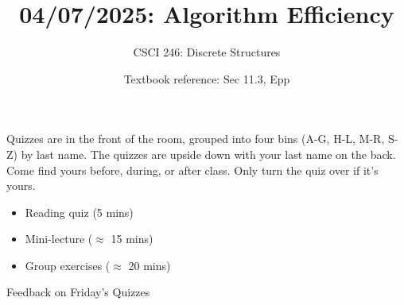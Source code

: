 \documentclass[10pt]{beamer}
\begin{document}




\title{04/07/2025: Algorithm Efficiency}
\author{CSCI 246: Discrete Structures}
\date{Textbook reference: Sec 11.3, Epp}

\begin{frame}
    \titlepage 
\end{frame}


\begin{frame}
\small
\begin{mygreenbox}[title=Graded Quiz Pickup]
Quizzes are in the front of the room, grouped into four bins (A-G, H-L, M-R, S-Z) by last name. The quizzes are upside down with your last name on the back. Come find yours before, during, or after class. Only turn the quiz over if it's yours.
\end{mygreenbox} 
\vfill 
%
\vfill 
\begin{myyellowbox}[title=Today's Agenda]
\begin{itemize}
	\item Reading quiz (5 mins)
	\item Mini-lecture ($\approx$ 15 mins)
	\item Group exercises ($\approx$ 20 mins)
\end{itemize}


\end{myyellowbox}
\vfill 

\end{frame}






\begin{frame}[standout]
Feedback on Friday's Quizzes
\end{frame}
\end{document}
